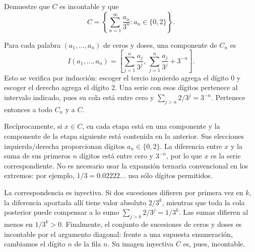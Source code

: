 \begin{ejercicio}\label{ej:lectura-8-7}
Demuestre que $C$ es incontable y que
\[
 C=\left\{\sum_{n=1}^\infty\frac{a_n}{3^n}:a_n\in\{0,2\}\right\}.
\]
\end{ejercicio}
\begin{solucion}
Para cada palabra $(a_1,\ldots,a_n)$ de ceros y doses, una componente de $C_n$ es
\[
 I(a_1,\ldots,a_n)=\left[\sum_{j=1}^n\frac{a_j}{3^j},\,
 \sum_{j=1}^n\frac{a_j}{3^j}+3^{-n}\right].
\]
Esto se verifica por inducción: escoger el tercio izquierdo agrega el dígito $0$ y escoger el derecho agrega el dígito $2$. Una serie con esos dígitos pertenece al intervalo indicado, pues su cola está entre cero y $\sum_{j>n}2/3^j=3^{-n}$. Pertenece entonces a todo $C_n$ y a $C$.

Recíprocamente, si $x\in C$, en cada etapa está en una componente y la componente de la etapa siguiente está contenida en la anterior. Sus elecciones izquierda/derecha proporcionan dígitos $a_n\in\{0,2\}$. La diferencia entre $x$ y la suma de sus primeros $n$ dígitos está entre cero y $3^{-n}$, por lo que $x$ es la serie correspondiente. No es necesario usar la expansión ternaria convencional en los extremos: por ejemplo, $1/3=0.02222\ldots$ usa sólo dígitos permitidos.

La correspondencia es inyectiva. Si dos sucesiones difieren por primera vez en $k$, la diferencia aportada allí tiene valor absoluto $2/3^k$, mientras que toda la cola posterior puede compensar a lo sumo $\sum_{j>k}2/3^j=1/3^k$. Las sumas difieren al menos en $1/3^k>0$. Finalmente, el conjunto de sucesiones de ceros y doses es incontable por el argumento diagonal: frente a una supuesta enumeración, cambiamos el dígito $n$ de la fila $n$. Su imagen inyectiva $C$ es, pues, incontable.
\end{solucion}

